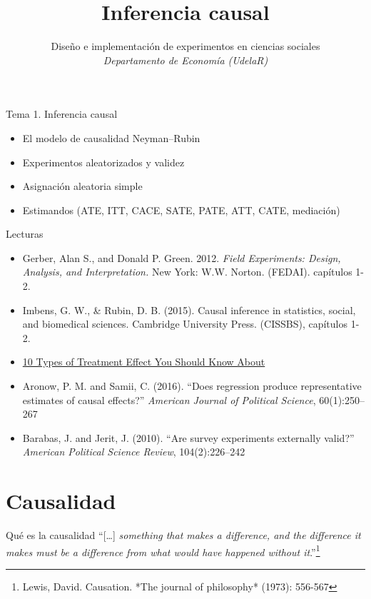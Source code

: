 \documentclass[
  ignorenonframetext,
]{beamer}
\title{Inferencia causal}
\author{Diseño e implementación de experimentos en ciencias sociales\\
\emph{Departamento de Economía (UdelaR)}}
\date{}
\providecommand{\tightlist}{%
  \setlength{\itemsep}{0pt}\setlength{\parskip}{0pt}}
\begin{document}
\frame{\titlepage}

\begin{frame}{Tema 1. Inferencia causal}
\protect\hypertarget{tema-1.-inferencia-causal}{}
\begin{itemize}
\tightlist
\item
  El modelo de causalidad Neyman--Rubin
\item
  Experimentos aleatorizados y validez
\item
  Asignación aleatoria simple
\item
  Estimandos (ATE, ITT, CACE, SATE, PATE, ATT, CATE, mediación)
\end{itemize}
\end{frame}

\begin{frame}{Lecturas}
\protect\hypertarget{lecturas}{}
\begin{itemize}
\item
  Gerber, Alan S., and Donald P. Green. 2012. \emph{Field Experiments:
  Design, Analysis, and Interpretation.} New York: W.W. Norton. (FEDAI).
  capítulos 1-2.
\item
  Imbens, G. W., \& Rubin, D. B. (2015). Causal inference in statistics,
  social, and biomedical sciences. Cambridge University Press. (CISSBS),
  capítulos 1-2.
\item
  \href{https://egap.org/resource/10-types-of-treatment-effect-you-should-know-about/}{10
  Types of Treatment Effect You Should Know About}
\item
  Aronow, P. M. and Samii, C. (2016). ``Does regression produce
  representative estimates of causal effects?'' \emph{American Journal
  of Political Science}, 60(1):250--267
\item
  Barabas, J. and Jerit, J. (2010). ``Are survey experiments externally
  valid?'' \emph{American Political Science Review}, 104(2):226--242
\end{itemize}
\end{frame}

\hypertarget{causalidad}{%
\section{Causalidad}\label{causalidad}}

\begin{frame}{Qué es la causalidad}
\protect\hypertarget{quuxe9-es-la-causalidad}{}
``{[}\ldots{]} \emph{something that makes a difference, and the
difference it makes must be a difference from what would have happened
without
it}.''\footnote{Lewis, David. Causation. *The journal of philosophy* (1973): 556-567}
\end{frame}
\end{document}
